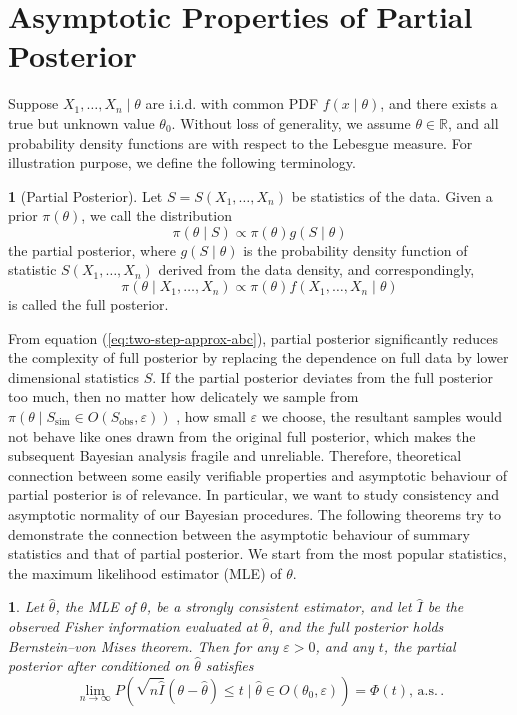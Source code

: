 \documentclass[oneside,english]{amsbook}
\numberwithin{section}{chapter}
\numberwithin{equation}{section}
\numberwithin{figure}{section}
\theoremstyle{plain}
\theoremstyle{plain}
\theoremstyle{definition}
\newtheorem{defn}{\protect\definitionname}
\theoremstyle{plain}
\newtheorem{thm}{\protect\theoremname}
\theoremstyle{plain}
\theoremstyle{remark}
\theoremstyle{definition}
\theoremstyle{definition}
\newcommand{\ascv}{\,\mathrm{a.s.}\,}
\providecommand{\definitionname}{Definition}
\providecommand{\theoremname}{Theorem}
\begin{document}
\section{\label{sec:asymp-partial-post}Asymptotic Properties of Partial Posterior}

Suppose $X_{1},\ldots,X_{n}\mid\theta$ are i.i.d. with common PDF
$f\left(x\mid\theta\right)$, and there exists a true but unknown
value $\theta_{0}$. Without loss of generality, we assume $\theta\in\mathbb{R}$,
and all probability density functions are with respect to the Lebesgue
measure. For illustration purpose, we define the following terminology.
\begin{defn}[Partial Posterior]
Let $S=S\left(X_{1},\ldots,X_{n}\right)$ be{} {statistics
} of the data. Given a prior $\pi\left(\theta\right)$,
we call the distribution 
\[
\pi\left(\theta\mid S\right)\propto\pi\left(\theta\right)g\left(S\mid\theta\right)
\]
the partial posterior, where $g\left(S\mid\theta\right)$ is the probability
density function of statistic $S\left(X_{1},\ldots,X_{n}\right)$
derived from the data density, and correspondingly, 
\[
\pi\left(\theta\mid X_{1},\ldots,X_{n}\right)\propto\pi\left(\theta\right)f\left(X_{1},\ldots,X_{n}\mid\theta\right)
\]
 is called the full posterior.
\end{defn}
From equation (\ref{eq:two-step-approx-abc}), partial posterior significantly
reduces the complexity of full posterior by replacing the dependence
on full data by lower dimensional statistics $S$. If the partial
posterior deviates from {the } full
posterior too much, then no matter how delicately we sample from $\pi\left(\theta\mid S_{\mathrm{sim}}\in O\left(S_{\mathrm{obs}},\varepsilon\right)\right)$
, how small $\varepsilon$ we choose, the resultant samples would
not behave like ones drawn from the original full posterior, which {makes } the subsequent Bayesian analysis fragile
and unreliable. Therefore, theoretical connection between some easily
verifiable properties and asymptotic behaviour of partial posterior
is of relevance. In particular, we want to study consistency and asymptotic
normality of our Bayesian procedures. The following theorems try to
demonstrate the connection between the asymptotic behaviour of summary
statistics and that of partial posterior. We start from the most popular
statistics, the maximum likelihood estimator (MLE) of $\theta$. 
\begin{thm}
\label{thm:bernstein-von-mises-mle}Let $\hat{\theta}$, the MLE of
$\theta$, be a strongly consistent estimator, and let $\hat{I}$
be the observed Fisher information evaluated at $\hat{\theta}$, and
the full posterior holds Bernstein--von Mises theorem. Then for any
$\varepsilon>0$, and any $t$, the partial posterior after conditioned
on $\hat{\theta}$ satisfies 
\[
\lim_{n\rightarrow\infty}P\left(\sqrt{n\hat{I}}\left(\theta-\hat{\theta}\right)\le t\mid\hat{\theta}\in O\left(\theta_{0},\varepsilon\right)\right)=\Phi\left(t\right),\ascv.
\]
\end{thm}
\end{document}
